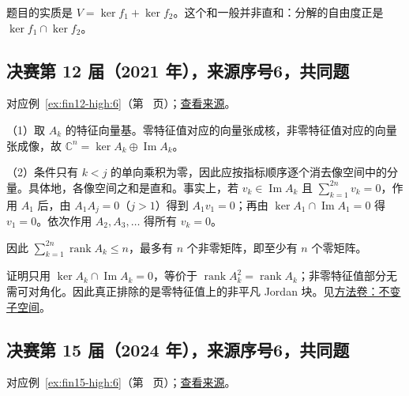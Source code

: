 \documentclass[12pt,fontset=fandol]{ctexart}
\begin{document}
\begin{remark}[方法与条件]

题目的实质是 $V=\ker f_1+\ker f_2$。这个和一般并非直和：分解的自由度正是 $\ker f_1\cap\ker f_2$。

\end{remark}

\subsection{决赛第 12 届（2021 年），来源序号6，共同题}\label{ans:fin12-high:6}\label{pr:fin12-high:6}

对应例~\ref{ex:fin12-high:6}（第~\pageref{ex:fin12-high:6} 页）；\href{https://github.com/lzxcr/cmc-mathematics/blob/64916fa1fdbc3e444a652eca204d5669058ee321/src/problems/finals/12/06.md}{查看来源}。

\begin{solve}

（1）取 $A_k$ 的特征向量基。零特征值对应的向量张成核，非零特征值对应的向量张成像，故 $\mathbb C^n=\ker A_k\oplus\operatorname{Im}A_k$。

（2）条件只有 $k<j$ 的单向乘积为零，因此应按指标顺序逐个消去像空间中的分量。具体地，各像空间之和是直和。事实上，若 $v_k\in\operatorname{Im}A_k$ 且 $\sum_{k=1}^{2n}v_k=0$，作用 $A_1$ 后，由 $A_1A_j=0$（$j>1$）得到 $A_1v_1=0$；再由 $\ker A_1\cap\operatorname{Im}A_1=0$ 得 $v_1=0$。依次作用 $A_2,A_3,\ldots$ 得所有 $v_k=0$。

因此 $\sum_{k=1}^{2n}\operatorname{rank}A_k\leq n$，最多有 $n$ 个非零矩阵，即至少有 $n$ 个零矩阵。

\end{solve}

\begin{remark}[方法与条件]

证明只用 $\ker A_k\cap\operatorname{Im}A_k=0$，等价于 $\operatorname{rank}A_k^2=\operatorname{rank}A_k$；非零特征值部分无需可对角化。因此真正排除的是零特征值上的非平凡 Jordan 块。见\hyperref[app:linear-invariant]{方法卷：不变子空间}。

\end{remark}

\subsection{决赛第 15 届（2024 年），来源序号6，共同题}\label{ans:fin15-high:6}\label{pr:fin15-high:6}

对应例~\ref{ex:fin15-high:6}（第~\pageref{ex:fin15-high:6} 页）；\href{https://github.com/lzxcr/cmc-mathematics/blob/64916fa1fdbc3e444a652eca204d5669058ee321/src/problems/finals/15/06.md}{查看来源}。
\end{document}
